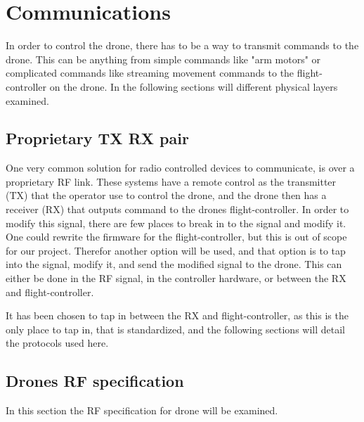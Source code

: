 \section{Communications}\label{s:coms}
In order to control the drone, there has to be a way to transmit commands to the drone. This can be anything from simple commands like "arm motors" or complicated commands like streaming movement commands to the flight-controller on the drone.
In the following sections will different physical layers examined. 

\subsection*{Proprietary TX RX pair}\label{ss:rc-txrx}
One very common solution for radio controlled devices to communicate, is over a proprietary RF link. These systems have a remote control as the transmitter (TX) that the operator use to control the drone, and the drone then has a receiver (RX) that outputs command to the drones flight-controller.
\newline
In order to modify this signal, there are few places to break in to the signal and modify it. One could rewrite the firmware for the flight-controller, but this is out of scope for our project. Therefor another option will be used, and that option is to tap into the signal, modify it, and send the modified signal to the drone.
This can either be done in the RF signal, in the controller hardware, or between the RX and flight-controller. 

It has been chosen to tap in between the RX and flight-controller, as this is the only place to tap in, that is standardized, and the following sections will detail the protocols used here.\\
\newline

\subsection*{Drones RF specification}
In this section the RF specification for drone will be examined. 

